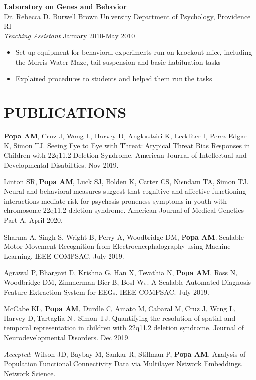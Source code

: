 \documentclass[line,margin,10pt]{res}
\begin{document}
\begin{resume}
 \textbf{Laboratory on Genes and Behavior}\\
 Dr. Rebecca D. Burwell \hfill Brown University Department of Psychology, Providence RI\\
 {\sl Teaching Assistant} \hfill January 2010-May 2010
\begin{itemize}\itemsep -2pt
\item Set up equipment for behavioral experiments run on knockout mice, including the Morris Water Maze, tail suspension and basic habituation tasks
\item Explained procedures to students and helped them run the tasks
\end{itemize}

\section{PUBLICATIONS}
\textbf{Popa AM}, Cruz J, Wong L, Harvey D, Angkustsiri K, Leckliter I, Perez-Edgar K, Simon TJ. Seeing Eye to Eye with Threat: Atypical Threat Bias Responses in Children with 22q11.2 Deletion Syndrome. American Journal of Intellectual and Developmental Disabilities. Nov 2019.

Linton SR,  \textbf{Popa AM},  Luck SJ,  Bolden K,  Carter CS,  Niendam TA, Simon TJ. Neural and behavioral measures suggest that cognitive and affective functioning interactions mediate risk for psychosis‐proneness symptoms in youth with chromosome 22q11.2 deletion syndrome. American Journal of Medical Genetics Part A. April 2020.

Sharma A, Singh S, Wright B, Perry A, Woodbridge DM, \textbf{Popa AM}. Scalable Motor Movement Recognition from Electroencephalography using Machine Learning. IEEE COMPSAC. July 2019.

Agrawal P, Bhargavi D, Krishna G, Han X, Tevathia N, \textbf{Popa AM}, Ross N, Woodbridge DM, Zimmerman-Bier B, Bosl WJ. A Scalable Automated Diagnosis Feature Extraction System for EEGs. IEEE COMPSAC. July 2019.

McCabe KL, \textbf{Popa AM}, Durdle C, Amato M, Cabaral M, Cruz J, Wong L, Harvey D, Tartaglia N., Simon TJ. Quantifying the resolution of spatial and temporal representation in children with 22q11.2 deletion syndrome. Journal of Neurodevelopmental Disorders. Dec 2019.

{\sl Accepted}: Wilson JD, Baybay M, Sankar R, Stillman P, \textbf{Popa AM}. Analysis of Population Functional Connectivity Data via Multilayer Network Embeddings. Network Science.


\end{resume}
\end{document}
